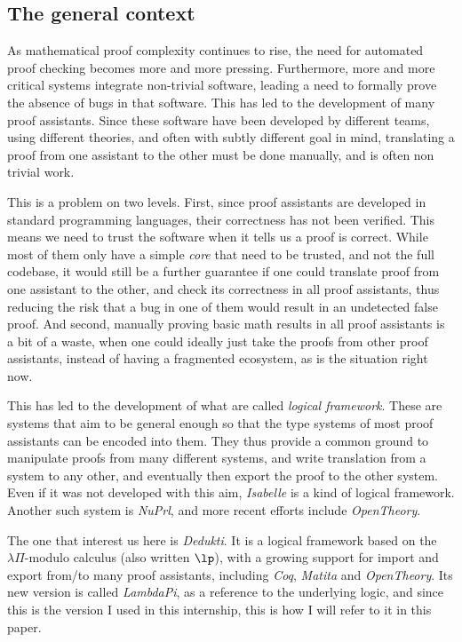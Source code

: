 
\thispagestyle{empty}
\subsection*{The general context}

As mathematical proof complexity continues to rise, the need for automated proof
checking becomes more and more pressing. Furthermore, more and more critical
systems integrate non-trivial software, leading a need to formally prove the
absence of bugs in that software. This has led to the development of many proof
assistants. Since these software have been developed by different teams, using
different theories, and often with subtly different goal in mind, translating a
proof from one assistant to the other must be done manually, and is often non
trivial work.

This is a problem on two levels. First, since proof assistants are developed in
standard programming languages, their correctness has not been verified. This
means we need to trust the software when it tells us a proof is correct. While
most of them only have a simple \emph{core} that need to be trusted, and not the
full codebase, it would still be a further guarantee if one could translate
proof from one assistant to the other, and check its correctness in all proof
assistants, thus reducing the risk that a bug in one of them would result in an
undetected false proof. And second, manually proving basic math results in all
proof assistants is a bit of a waste, when one could ideally just take the
proofs from other proof assistants, instead of having a fragmented ecosystem, as
is the situation right now.

This has led to the development of what are called \emph{logical framework}.
These are systems that aim to be general enough so that the type systems of most
proof assistants can be encoded into them. They thus provide a common ground to
manipulate proofs from many different systems, and write translation from a
system to any other, and eventually then export the proof to the other system.
Even if it was not developed with this aim,
\emph{Isabelle}\cite{nipkow_isabellehol_2002} is a kind of logical framework.
Another such system is \emph{NuPrl}\cite{allen_nuprl_2000}, and more recent
efforts include \emph{OpenTheory}\cite{hurd_opentheory_2009}.

The one that interest us here is \emph{Dedukti}\cite{assaf_dedukti_2016}. It is
a logical framework based on the $\lambda\Pi$-modulo calculus (also written $\lp$), with
a growing support for import and export from/to many proof assistants, including
\emph{Coq}, \emph{Matita} and \emph{OpenTheory}. Its new version is called
\emph{LambdaPi}, as a reference to the underlying logic, and since this is the
version I used in this internship, this is how I will refer to it in this paper.

